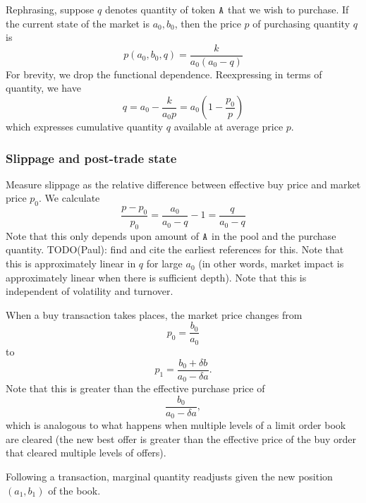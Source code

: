 \documentclass[11pt, reqno]{amsart}
\theoremstyle{definition}
\theoremstyle{remark}
\newcommand{\tA}{\textnormal{\texttt{A}}}
\begin{document}
Rephrasing, suppose $q$ denotes quantity of token $\tA$ that we wish to
purchase. If the current state of the market is $a_0, b_0$, then the price $p$
of purchasing quantity $q$ is
\[
	p(a_0, b_0, q) = \frac{k}{a_0 (a_0 - q)}
\]
For brevity, we drop the functional dependence. Reexpressing in
terms of quantity, we have
\[
    q = a_0 - \frac{k}{a_0 p} = a_0 \left(1 - \frac{p_0}{p}\right)
\]
which expresses cumulative quantity $q$ available at average price $p$.

\subsubsection{Slippage and post-trade state}
Measure slippage as the relative difference between effective buy price and
market price $p_0$. We calculate
\[
    \frac{p - p_0}{p_0} = \frac{a_0}{a_0 - q} - 1 = \frac{q}{a_0 - q}
\]
Note that this only depends upon amount of $\tA$ in the pool and the purchase
quantity. TODO(Paul): find and cite the earliest references for this.
Note that this is approximately linear in $q$ for large $a_0$ (in other
words, market impact is approximately linear when there is sufficient
depth). Note that this is independent of volatility and turnover.

When a buy transaction takes places, the market price changes from
\[
	p_0 = \frac{b_0}{a_0}
\]
to
\[
	p_1 = \frac{b_0 + \delta b}{a_0 - \delta a}.
\]
Note that this is greater than the effective purchase price of
\[
	\frac{b_0}{a_0 - \delta a},
\]
which is analogous to what happens when multiple levels of a limit order book
are cleared (the new best offer is greater than the effective price of the buy
order that cleared multiple levels of offers).

Following a transaction, marginal quantity readjusts given the new position
$(a_1, b_1)$ of the book.



\end{document}
